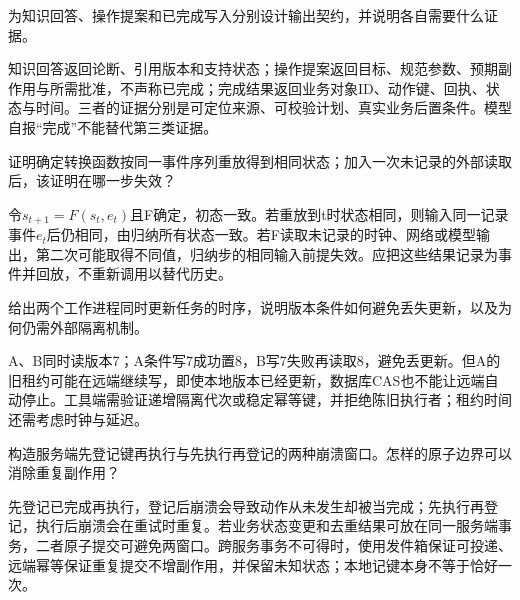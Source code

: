 
\begin{exercises}
\begin{exercise} 为知识回答、操作提案和已完成写入分别设计输出契约，并说明各自需要什么证据。

\begin{solution}
知识回答返回论断、引用版本和支持状态；操作提案返回目标、规范参数、预期副作用与所需批准，不声称已完成；完成结果返回业务对象ID、动作键、回执、状态与时间。三者的证据分别是可定位来源、可校验计划、真实业务后置条件。模型自报“完成”不能替代第三类证据。
\end{solution}
\end{exercise}

\begin{exercise} 证明确定转换函数按同一事件序列重放得到相同状态；加入一次未记录的外部读取后，该证明在哪一步失效？

\begin{solution}
令$s_{t+1}=F(s_t,e_t)$且F确定，初态一致。若重放到t时状态相同，则输入同一记录事件$e_t$后仍相同，由归纳所有状态一致。若F读取未记录的时钟、网络或模型输出，第二次可能取得不同值，归纳步的相同输入前提失效。应把这些结果记录为事件并回放，不重新调用以替代历史。
\end{solution}
\end{exercise}

\begin{exercise} 给出两个工作进程同时更新任务的时序，说明版本条件如何避免丢失更新，以及为何仍需外部隔离机制。

\begin{solution}
A、B同时读版本7；A条件写7成功置8，B写7失败再读取8，避免丢更新。但A的旧租约可能在远端继续写，即使本地版本已经更新，数据库CAS也不能让远端自动停止。工具端需验证递增隔离代次或稳定幂等键，并拒绝陈旧执行者；租约时间还需考虑时钟与延迟。
\end{solution}
\end{exercise}

\begin{exercise} 构造服务端先登记键再执行与先执行再登记的两种崩溃窗口。怎样的原子边界可以消除重复副作用？

\begin{solution}
先登记已完成再执行，登记后崩溃会导致动作从未发生却被当完成；先执行再登记，执行后崩溃会在重试时重复。若业务状态变更和去重结果可放在同一服务端事务，二者原子提交可避免两窗口。跨服务事务不可得时，使用发件箱保证可投递、远端幂等保证重复提交不增副作用，并保留未知状态；本地记键本身不等于恰好一次。
\end{solution}
\end{exercise}


\end{exercises}
